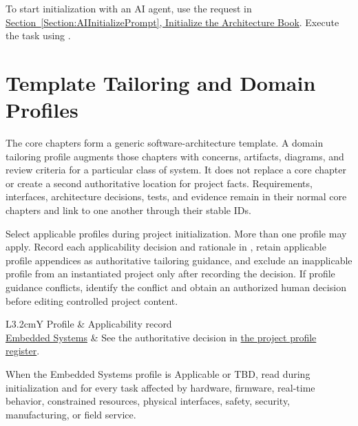 To start initialization with an AI agent, use the request in
\hyperref[Section:AIInitializePrompt]{Section~\ref{Section:AIInitializePrompt},
Initialize the Architecture Book}. Execute the task using
.

\section{Template Tailoring and Domain Profiles}
\label{Section:DomainProfiles}
The core chapters form a generic software-architecture template. A domain
tailoring profile augments those chapters with concerns, artifacts, diagrams,
and review criteria for a particular class of system. It does not replace a
core chapter or create a second authoritative location for project facts.
Requirements, interfaces, architecture decisions, tests, and evidence remain
in their normal core chapters and link to one another through their stable IDs.

Select applicable profiles during project initialization. More than one
profile may apply. Record each applicability decision and rationale in
, retain applicable profile appendices as
authoritative tailoring guidance, and exclude an inapplicable profile from an
instantiated project only after recording the decision. If profile guidance
conflicts, identify the conflict and obtain an authorized human decision before
editing controlled project content.

\begin{table}[htbp]
\centering
\caption{Domain Profile Applicability}\label{Table:DomainProfileApplicability}
\begin{tabularx}{\linewidth}{L{3.2cm}Y}
\toprule Profile & Applicability record\\\midrule
\hyperref[Chapter:EmbeddedSystemsProfile]{Embedded Systems} & See the authoritative decision in \hyperref[Table:ProjectDomainProfiles]{the project profile register}.\\\bottomrule
\end{tabularx}
\end{table}

When the Embedded Systems profile is Applicable or TBD, read
 during initialization and for every task
affected by hardware, firmware, real-time behavior, constrained resources,
physical interfaces, safety, security, manufacturing, or field service.

